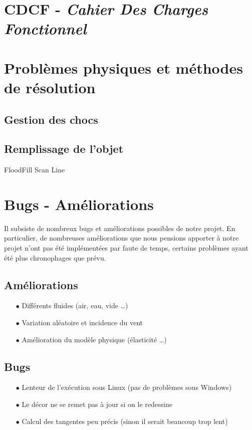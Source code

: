 \section{CDCF - \emph{Cahier Des Charges Fonctionnel}}
\section{Problèmes physiques et méthodes de résolution}
\subsection{Gestion des chocs}
\subsection{Remplissage de l'objet}
FloodFill Scan Line


\section{Bugs - Améliorations}
Il subsiste de nombreux bugs et améliorations possibles de notre projet.
En particulier, de nombreuses améliorations que nous pensions apporter
à notre projet n'ont pas été implémentées par faute de temps, certains 
problèmes ayant été plus chronophages que prévu.
\subsection{Améliorations}
\begin{itemize}
\item[$\bullet$] Différents fluides (air, eau, vide \dots)
\item[$\bullet$] Variation aléatoire et incidence du vent 
\item[$\bullet$] Amélioration du modèle physique (élasticité \dots)
\end{itemize}
\subsection{Bugs}
\begin{itemize}
\item[$\bullet$] Lenteur de l'exécution sous Linux (pas de problèmes sous Windows)
\item[$\bullet$] Le décor ne se remet pas à jour si on le redessine
\item[$\bullet$] Calcul des tangentes peu précis (sinon il serait beaucoup trop lent)
\end{itemize}
